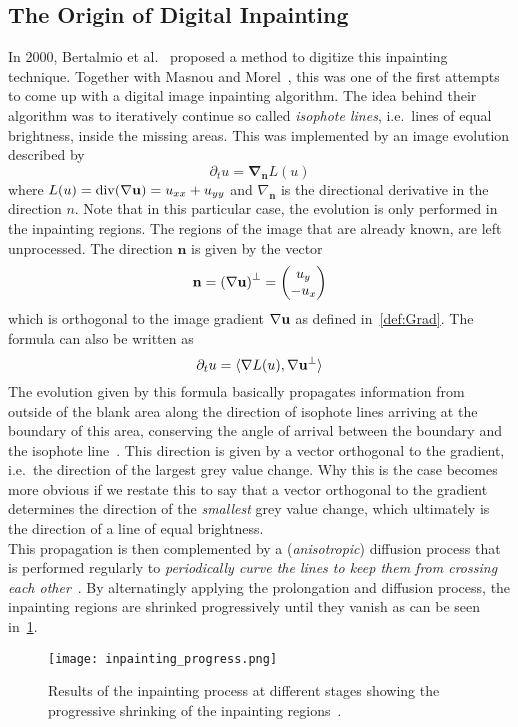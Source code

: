 \subsection{The Origin of Digital Inpainting}
In 2000, Bertalmio et al.~\cite{bertalmio00} proposed a method to digitize this inpainting
technique.
Together with Masnou and Morel~\cite{masnou98}, this was one of the first attempts to come up 
with a digital image inpainting algorithm.
The idea behind their algorithm was to iteratively continue so called \textit{isophote
lines}, i.e.\ lines of equal brightness, inside the missing areas. 
This was implemented by an image evolution described by 
\begin{equation}
    \partial_t u = \mathbf{\nabla_n} L(u)  
\end{equation}
where $L(u) = \operatorname{div}(\mathbf{\nabla} \mathbf{u}) = u_{xx} + u_{yy}$ and $\nabla_\mathbf{n}$ is the 
directional derivative in the direction $n$. Note that in this particular case, the evolution is
only performed in the inpainting regions. The regions of the image that are already known, are left
unprocessed. The direction $\mathbf{n}$ is given by the vector
\begin{equation}
    \mathbf{n} = {(\mathbf{\nabla} \mathbf{u})}^\bot = \begin{pmatrix}
        u_y\\-u_x
    \end{pmatrix}
\end{equation}
which is orthogonal to the image gradient $\mathbf{\nabla} \mathbf{u}$ as defined in~\ref{def:Grad}.
The formula can also be written as 
\begin{equation}
    \partial_t u = \langle \mathbf{\nabla} L(u), \mathbf{\nabla} \mathbf{u}^\bot\rangle
\end{equation}
The evolution given by this formula basically propagates information from outside of the blank
area along the direction of isophote lines arriving at the boundary of this area, conserving the
angle of arrival between the boundary and the isophote line~\cite{bertalmio00}.
This direction is given by a vector orthogonal to the gradient, i.e.\ the direction of the largest
grey value change.
Why this is the case becomes more obvious if we restate this to say that a vector orthogonal to the gradient
determines the direction of the \textit{smallest} grey value change, which ultimately is the
direction of a line of equal brightness.\\
This propagation is then complemented by a (\textit{anisotropic}) diffusion process that is performed regularly to
\textit{periodically curve the lines to keep them from crossing each other}~\cite{bertalmio00}.
By alternatingly applying the prolongation and diffusion process, the inpainting regions are
shrinked progressively until they vanish as can be seen in~\ref{fig:InpaintingProgress}.
\begin{figure}[h]
    \centering
    \texttt{[image: inpainting\_progress.png]}
    \caption{Results of the inpainting process at different stages showing the progressive
    shrinking of the inpainting regions~\cite{bertalmio00}.}\label{fig:InpaintingProgress}
\end{figure}
\newpage\noindent
